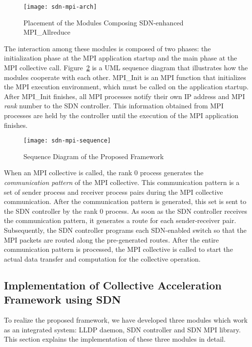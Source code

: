 \begin{figure}
    \centering
    \texttt{[image: sdn-mpi-arch]}
    \caption{Placement of the Modules Composing SDN-enhanced MPI\_Allreduce}%
    \label{fig:proposal-placement}
\end{figure}

The interaction among these modules is composed of two phases: the
initialization phase at the MPI application startup and the main phase at the
MPI collective call. Figure~\ref{fig:proposal-sequence} is a UML sequence
diagram that illustrates how the modules cooperate with each other. MPI\_Init
is an MPI function that initializes the MPI execution environment, which must
be called on the application startup. After MPI\_Init finishes, all MPI
processes notify their own IP address and MPI \emph{rank} number to the SDN
controller. This information obtained from MPI processes are held by the
controller until the execution of the MPI application finishes.

\begin{figure}
    \centering
    \texttt{[image: sdn-mpi-sequence]}
    \caption{Sequence Diagram of the Proposed Framework}%
    \label{fig:proposal-sequence}
\end{figure}

When an MPI collective is called, the rank 0 process generates the
\emph{communication pattern} of the MPI collective. This communication pattern is
a set of sender process and receiver process pairs during the MPI collective
communication. After the communication pattern is generated, this set is sent
to the SDN controller by the rank 0 process. As soon as the SDN controller
receives the communication pattern, it generates a route for each
sender-receiver pair. Subsequently, the SDN controller programs each
SDN-enabled switch so that the MPI packets are routed along the pre-generated
routes. After the entire communication pattern is processed, the MPI
collective is called to start the actual data transfer and computation for the
collective operation.

\subsection{Implementation of Collective Acceleration Framework using SDN}

To realize the proposed framework, we have developed three modules which
work as an integrated system: LLDP daemon, SDN controller and SDN MPI library.
This section explains the implementation of these three modules in detail.

